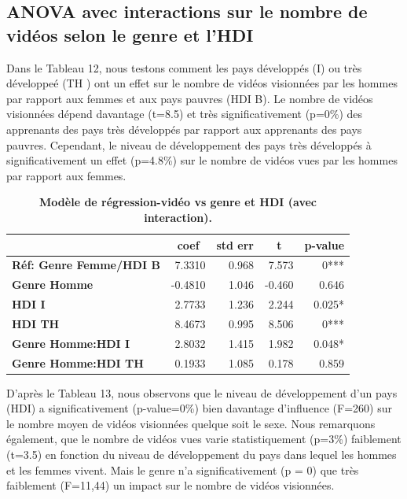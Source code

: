 \documentclass[12pt, a4paper, titlepage, table]{article}
\begin{document}
	\subsection{ANOVA avec interactions sur le nombre de vidéos selon le genre et l'HDI}	
	Dans le Tableau 12, nous testons comment les pays développés (I) ou très développeé (TH ) ont un effet sur le nombre de vidéos visionnées par les hommes par rapport aux femmes et aux pays pauvres (HDI B).   
	Le nombre de vidéos visionnées dépend davantage (t=8.5) et très significativement (p=0\%) des apprenants des pays très développés par rapport aux apprenants des pays pauvres.  
	Cependant, le niveau de développement des pays très développés à significativement un effet (p=4.8\%) sur le nombre de vidéos vues par les hommes par rapport aux femmes.  
	
	\begin{table}[H]
		\centering
		\fontsize{12}{20}\selectfont
		\begin{tabular}{|l|r|r|r|r|}
			\hline
			\multicolumn{1}{|c|}{\textbf{}}&
			\multicolumn{1}{c|}{\textbf{coef}}&
			\multicolumn{1}{c|}{\textbf{std err}}&
			\multicolumn{1}{c|}{\textbf{t}}&
			\multicolumn{1}{c|}{\textbf{p-value}}\\	
			\hline
				\textbf{Réf: Genre Femme/HDI B}&			7.3310&			0.968&	7.573&	0***\\
				\textbf{Genre Homme}&	-0.4810&		1.046&	-0.460&	0.646\\	
				\textbf{HDI I}&	2.7733&			1.236&	2.244&	0.025*\\	
				\textbf{HDI TH}&	8.4673&			0.995&	8.506&	0***\\	
				\textbf{Genre Homme:HDI I}&	2.8032&	1.415&	1.982&	0.048*\\
				\textbf{Genre Homme:HDI TH}&	0.1933&	1.085&	0.178&	0.859\\
			\hline
		\end{tabular}
	\caption{\textbf{Modèle de régression-vidéo vs genre et HDI (avec interaction).}}
\end{table}
	
	D'après le Tableau 13, nous observons que le niveau de développement d'un pays (HDI) a significativement (p-value=0\%) bien davantage d'influence (F=260) sur le nombre moyen de vidéos 
	visionnées quelque soit le sexe. Nous remarquons également, que le nombre de vidéos vues varie statistiquement (p=3\%) faiblement (t=3.5) en fonction  
	du niveau de développement du pays dans lequel les hommes et les femmes vivent. Mais le genre n'a significativement (p = 0) que très faiblement (F=11,44) un impact sur le nombre de vidéos visionnées.
	
\end{document}
